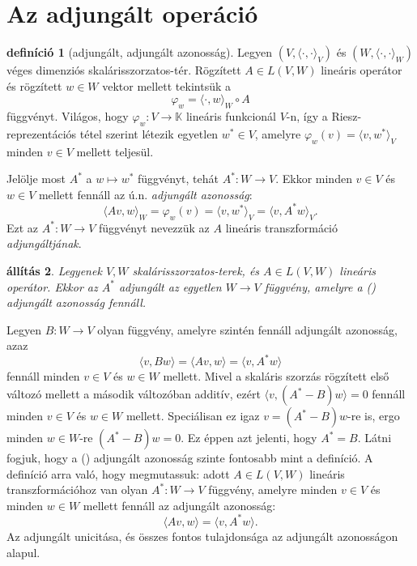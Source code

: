 \documentclass[a4paper, showtrims]{memoir}
\makeatletter
\renewenvironment{proof}[1][\proofname]
    {\par\pushQED{\qed}%
    \normalfont \topsep6\p@\@plus6\p@\relax
    \trivlist
    \item[\hskip\labelsep
        \itshape
    #1\@addpunct{:}]\ignorespaces}
    {\popQED\endtrivlist\@endpefalse}
\theoremstyle{plain}
\newtheorem{proposition}{állítás}[chapter]
\theoremstyle{remark}
\theoremstyle{definition}
\newtheorem{definition}[proposition]{definíció}
\newcommand{\ip}[2]{\langle#1,#2\rangle}
\makeatother
\begin{document}
\section{Az adjungált operáció}
\begin{definition}[adjungált, adjungált azonosság]
	Legyen $\left( V,\ip{\cdot}{\cdot}_V \right)$ és
	$\left( W,\ip{\cdot}{\cdot}_W \right)$ véges dimenziós ska\-láris\-szor\-zatos-tér.
	Rögzített $A\in L\left( V,W \right)$ lineáris operátor és rögzített $w\in W$ vektor mellett tekintsük a
	\[
		\varphi_w=
		\ip{\cdot}{w}_W\circ A
	\]
	függvényt.
	Világos, hogy $\varphi_w:V\to\mathbb{K}$ lineáris funkcionál $V$-n,
	így a Riesz-reprezentációs tétel szerint létezik egyetlen $w^\ast\in V$,
	amelyre
	$\varphi_w\left( v \right)=\ip{v}{w^\ast}_V$ minden $v\in V$ mellett teljesül.

	Jelölje most $A^\ast$ a $w\mapsto w^\ast$ függvényt, tehát
	$A^\ast:W\to V$.
	Ekkor minden $v\in V$ és $w\in V$ mellett fennáll az ú.n. \emph{adjungált azonosság}:
	\[
		\ip{Av}{w}_W
		=
		\varphi_w\left( v \right)
		=
		\ip{v}{w^\ast}_V
		=
		\ip{v}{A^\ast w}_V.\tag{\dag}
	\]
	Ezt az $A^\ast:W\to V$ függvényt nevezzük az $A$ lineáris transzformáció \emph{adjungáltjának}.
\end{definition}
\begin{proposition}
	Legyenek $V,W$ skalárisszorzatos-terek, és $A\in L\left( V,W \right)$ lineáris operátor.
	Ekkor az $A^\ast$ adjungált az egyetlen $W\to V$ függvény,
	amelyre a (\dag) adjungált azonosság fennáll.
\end{proposition}
\begin{proof}
	Legyen $B:W\to V$ olyan függvény, amelyre szintén fennáll adjungált azonosság,
	azaz
	\[
		\ip{v}{Bw}
		=
		\ip{Av}{w}
		=
		\ip{v}{A^\ast w}
	\]
	fennáll minden $v\in V$ és $w\in W$ mellett.
	Mivel a skaláris szorzás rögzített első változó mellett a második változóban additív,
	ezért
	$\ip{v}{\left( A^\ast-B \right)w}=0$ fennáll minden $v\in V$ és $w\in W$ mellett.
	Speciálisan ez igaz $v=\left( A^\ast-B \right)w$-re is, ergo minden $w\in W$-re
	$\left( A^\ast-B \right)w=0$.
	Ez éppen azt jelenti, hogy $A^\ast=B$.
\end{proof}
Látni fogjuk, hogy a (\dag) adjungált azonosság szinte fontosabb mint a definíció.
A definíció arra való, hogy megmutassuk: adott $A\in L\left( V,W \right)$ lineáris transzformációhoz van olyan
$A^\ast:W\to V$ függvény, amelyre minden $v\in V$ és minden $w\in W$ mellett fennáll az adjungált azonosság:
\[
	\ip{Av}{w}
	=
	\ip{v}{A^\ast w}.
	\tag{\dag}
\]
Az adjungált unicitása, és összes fontos tulajdonsága az adjungált azonosságon alapul.
\end{document}
